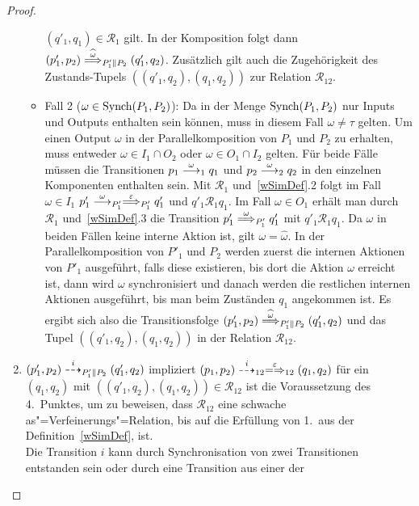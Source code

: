 \begin{proof}
\begin{enumerate}
\begin{itemize}
          $(q'_1,q_1)\in\mathcal{R}_1$ gilt. In der Komposition folgt dann
          $(p'_1,p_2) \weakmust[\widehat{\omega}]_{P'_1\|P_2} (q'_1,q_2)$.
          Zusätzlich gilt auch die Zugehörigkeit des Zustands-Tupels
          $((q'_1,q_2),(q_1,q_2))$ zur Relation $\mathcal{R}_{12}$.
        \item Fall 2 ($\omega\in\mathrm{Synch} (P_1,P_2)$): Da in der Menge $\mathrm{Synch}
          (P_1,P_2)$ nur Inputs und Outputs enthalten sein können, muss in
          diesem Fall $\omega\neq\tau$ gelten. Um einen Output $\omega$ in der
          Parallelkomposition von $P_1$ und $P_2$ zu erhalten, muss entweder
          $\omega\in I_1\cap O_2$ oder $\omega\in O_1\cap I_2$ gelten. Für
          beide Fälle müssen die Transitionen $p_1\must[\omega]_1 q_1$ und
          $p_2\must[\omega]_2 q_2$ in den einzelnen Komponenten enthalten sein.
          Mit $\mathcal{R}_1$ und~\ref{wSimDef}.2 folgt im Fall $\omega\in
          I_1$ $p'_1\must[\omega]_{P'_1} \weakmust[\varepsilon]_{P'_1} q'_1$
          und $q'_1\mathcal{R}_1 q_1$. Im Fall $\omega\in O_1$ erhält man durch
          $\mathcal{R}_1$ und~\ref{wSimDef}.3 die Transition $p'_1
          \weakmust[\omega]_{P'_1} q'_1$ mit $q'_1\mathcal{R}_1 q_1$. Da
          $\omega$ in beiden Fällen keine interne Aktion ist, gilt $\omega
          =\widehat{\omega}$. In der Parallelkomposition von $P'_1$ und $P_2$
          werden zuerst die internen Aktionen von $P'_1$ ausgeführt, falls
          diese existieren, bis dort die Aktion $\omega$ erreicht ist, dann
          wird $\omega$ synchronisiert und danach werden die restlichen
          internen Aktionen ausgeführt, bis man beim Zuständen $q_1$ angekommen
          ist. Es ergibt sich also die Transitionsfolge $(p'_1,p_2)
          \weakmust[\widehat{\omega}]_{P'_1\|P_2} (q'_1,q_2)$ und das Tupel
          $((q'_1,q_2),(q_1,q_2))$ in der Relation $\mathcal{R}_{12}$.
      \end{itemize}
    \item $(p'_1,p_2)\may[i]_{P'_1\|P_2}(q'_1,q_2)$ impliziert $(p_1,p_2)
      \may[i]_{12} \weakmay[\varepsilon]_{12} (q_1,q_2)$ für ein $(q_1,q_2)$
      mit $((q'_1,q_2),(q_1,q_2))\in\mathcal{R}_{12}$ ist die Voraussetzung
      des 4.\ Punktes, um zu beweisen, dass $\mathcal{R}_{12}$ eine schwache
      as"=Verfeinerungs"=Relation, bis auf die Erfüllung von 1.\ aus der
      Definition~\ref{wSimDef}, ist.\\
      Die Transition $i$ kann durch Synchronisation von zwei
      Transitionen entstanden sein oder durch eine Transition aus einer der

\end{enumerate}
\end{proof}
